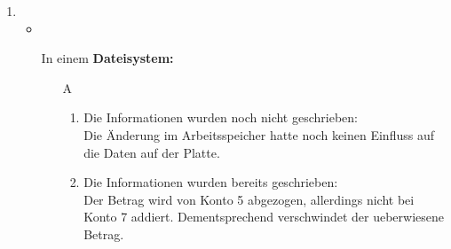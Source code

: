 \documentclass{article}
\begin{document}
\begin{enumerate}
\begin{enumerate}
            \end{enumerate}
        \item
            \begin{itemize}
                \item 
                \item[In einem \textbf{Dateisystem:}]
                        \begin{enumerate}
                                \item[A]
                                \begin{enumerate}
                                        \item Die Informationen wurden noch nicht geschrieben: \\
                                                Die Änderung im Arbeitsspeicher hatte noch keinen Einfluss auf die Daten auf der Platte. \\
                                        \item Die Informationen wurden bereits geschrieben: \\
                                                Der Betrag wird von Konto 5 abgezogen, allerdings nicht bei Konto 7 addiert. Dementsprechend verschwindet der ueberwiesene Betrag.


\end{enumerate}
\end{enumerate}
\end{itemize}
\end{enumerate}
\end{document}
